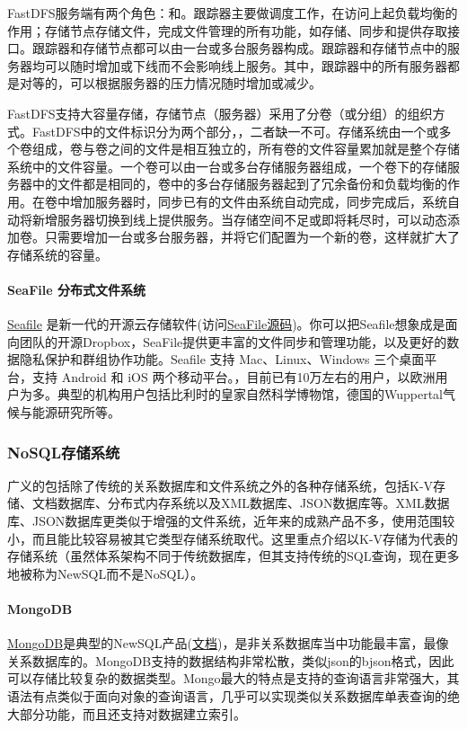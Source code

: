 \documentclass[letterpaper,10pt,english]{sphinxmanual}
\begin{document}
FastDFS服务端有两个角色：和。跟踪器主要做调度工作，在访问上起负载均衡的作用；存储节点存储文件，完成文件管理的所有功能，如存储、同步和提供存取接口。跟踪器和存储节点都可以由一台或多台服务器构成。跟踪器和存储节点中的服务器均可以随时增加或下线而不会影响线上服务。其中，跟踪器中的所有服务器都是对等的，可以根据服务器的压力情况随时增加或减少。

FastDFS支持大容量存储，存储节点（服务器）采用了分卷（或分组）的组织方式。FastDFS中的文件标识分为两个部分，，二者缺一不可。存储系统由一个或多个卷组成，卷与卷之间的文件是相互独立的，所有卷的文件容量累加就是整个存储系统中的文件容量。一个卷可以由一台或多台存储服务器组成，一个卷下的存储服务器中的文件都是相同的，卷中的多台存储服务器起到了冗余备份和负载均衡的作用。在卷中增加服务器时，同步已有的文件由系统自动完成，同步完成后，系统自动将新增服务器切换到线上提供服务。当存储空间不足或即将耗尽时，可以动态添加卷。只需要增加一台或多台服务器，并将它们配置为一个新的卷，这样就扩大了存储系统的容量。


\paragraph{SeaFile 分布式文件系统}
\label{gispark_cloud:SeaFile-_u5206_u5e03_u5f0f_u6587_u4ef6_u7cfb_u7edf}
\href{https://www.seafile.com/home/}{Seafile}
是新一代的开源云存储软件(访问\href{http://git.oschina.net/lins05/seafile}{SeaFile源码})。你可以把Seafile想象成是面向团队的开源Dropbox，SeaFile提供更丰富的文件同步和管理功能，以及更好的数据隐私保护和群组协作功能。Seafile
支持 Mac、Linux、Windows 三个桌面平台，支持 Android 和 iOS
两个移动平台。，目前已有10万左右的用户，以欧洲用户为多。典型的机构用户包括比利时的皇家自然科学博物馆，德国的Wuppertal气候与能源研究所等。


\subsubsection{NoSQL存储系统}
\label{gispark_cloud:NoSQL_u5b58_u50a8_u7cfb_u7edf}
广义的包括除了传统的关系数据库和文件系统之外的各种存储系统，包括K-V存储、文档数据库、分布式内存系统以及XML数据库、JSON数据库等。XML数据库、JSON数据库更类似于增强的文件系统，近年来的成熟产品不多，使用范围较小，而且能比较容易被其它类型存储系统取代。这里重点介绍以K-V存储为代表的存储系统（虽然体系架构不同于传统数据库，但其支持传统的SQL查询，现在更多地被称为NewSQL而不是NoSQL）。


\paragraph{MongoDB}
\label{gispark_cloud:MongoDB}
\href{https://github.com/mongodb}{MongoDB}是典型的NewSQL产品(\href{https://github.com/mongodb/docs}{文档})，是非关系数据库当中功能最丰富，最像关系数据库的。MongoDB支持的数据结构非常松散，类似json的bjson格式，因此可以存储比较复杂的数据类型。Mongo最大的特点是支持的查询语言非常强大，其语法有点类似于面向对象的查询语言，几乎可以实现类似关系数据库单表查询的绝大部分功能，而且还支持对数据建立索引。
\end{document}
